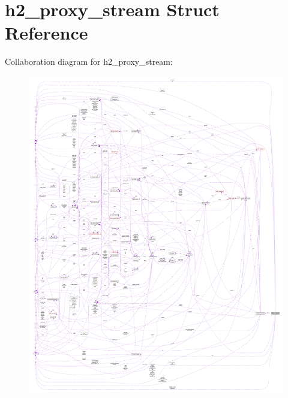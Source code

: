 \hypertarget{structh2__proxy__stream}{}\section{h2\+\_\+proxy\+\_\+stream Struct Reference}
\label{structh2__proxy__stream}


Collaboration diagram for h2\+\_\+proxy\+\_\+stream\+:
\nopagebreak
\begin{figure}[H]
\begin{center}
\leavevmode
\includegraphics[width=350pt]{structh2__proxy__stream__coll__graph}
\end{center}
\end{figure}
